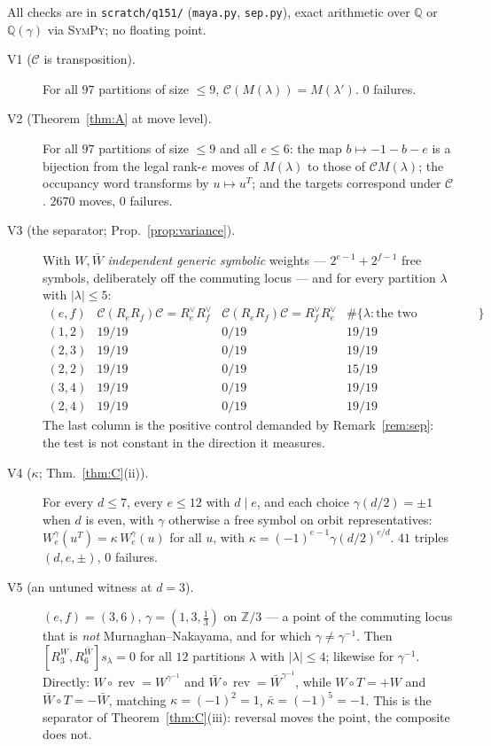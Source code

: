 \documentclass[11pt]{article}
\theoremstyle{definition}
\theoremstyle{remark}
\newcommand{\Z}{\mathbb{Z}}
\newcommand{\Q}{\mathbb{Q}}
\newcommand{\Cop}{\mathcal{C}}
\newcommand{\rev}{\operatorname{rev}}
\begin{document}
All checks are in \texttt{scratch/q151/} (\texttt{maya.py}, \texttt{sep.py}), exact
arithmetic over $\Q$ or $\Q(\gamma)$ via \textsc{SymPy}; no floating point.

\begin{description}
\item[V1 ($\Cop$ is transposition).]  For all $97$ partitions of size $\le9$,
  $\Cop(M(\lambda))=M(\lambda')$.  $0$ failures.

\item[V2 (Theorem~\ref{thm:A} at move level).]  For all $97$ partitions of size $\le9$ and
  all $e\le6$: the map $b\mapsto-1-b-e$ is a bijection from the legal rank-$e$ moves of
  $M(\lambda)$ to those of $\Cop M(\lambda)$; the occupancy word transforms by $u\mapsto
  u^{T}$; and the targets correspond under $\Cop$.  $2670$ moves, $0$ failures.

\item[V3 (the separator; Prop.~\ref{prop:variance}).]  With $W,\bar W$ \emph{independent
  generic symbolic} weights --- $2^{e-1}+2^{f-1}$ free symbols, deliberately off the
  commuting locus --- and for every partition $\lambda$ with $|\lambda|\le5$:
  \[
  \begin{array}{c|ccc}
    (e,f) & \Cop(R_eR_f)\Cop = R_e^\vee R_f^\vee & \Cop(R_eR_f)\Cop = R_f^\vee R_e^\vee
          & \#\{\lambda: \text{the two candidates differ}\}\\\hline
    (1,2) & 19/19 & 0/19 & 19/19\\
    (2,3) & 19/19 & 0/19 & 19/19\\
    (2,2) & 19/19 & 0/19 & 15/19\\
    (3,4) & 19/19 & 0/19 & 19/19\\
    (2,4) & 19/19 & 0/19 & 19/19
  \end{array}
  \]
  The last column is the positive control demanded by Remark~\ref{rem:sep}: the test is not
  constant in the direction it measures.

\item[V4 ($\kappa$; Thm.~\ref{thm:C}(ii)).]  For every $d\le7$, every $e\le12$ with $d\mid
  e$, and each choice $\gamma(d/2)=\pm1$ when $d$ is even, with $\gamma$ otherwise a free
  symbol on orbit representatives: $W^{\gamma}_e(u^{T})=\kappa\,W^{\gamma}_e(u)$ for all
  $u$, with $\kappa=(-1)^{e-1}\gamma(d/2)^{e/d}$.  $41$ triples $(d,e,\pm)$, $0$ failures.

\item[V5 (an untuned witness at $d=3$).]  $(e,f)=(3,6)$, $\gamma=(1,3,\tfrac13)$ on $\Z/3$
  --- a point of the commuting locus that is \emph{not} Murnaghan--Nakayama, and for which
  $\gamma\ne\gamma^{-1}$.  Then $[R_3^{W},R_6^{\bar W}]s_\lambda=0$ for all $12$ partitions
  $\lambda$ with $|\lambda|\le4$; likewise for $\gamma^{-1}$.  Directly:
  $W\circ\rev=W^{\gamma^{-1}}$ and $\bar W\circ\rev=\bar W^{\gamma^{-1}}$, while
  $W\circ T=+W$ and $\bar W\circ T=-\bar W$, matching $\kappa=(-1)^{2}=1$,
  $\bar\kappa=(-1)^{5}=-1$.  This is the separator of Theorem~\ref{thm:C}(iii): reversal
  moves the point, the composite does not.


\end{description}
\end{document}

